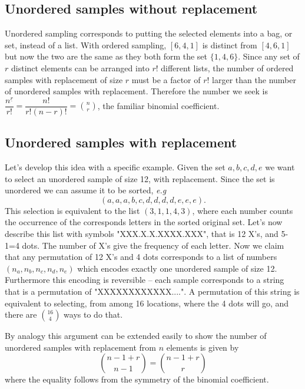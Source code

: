 \documentclass[../main.tex]{subfiles}
\begin{document}
\subsection{Unordered samples without replacement}
Unordered sampling corresponds to putting the selected elements into a
bag, or set, instead of a list. With ordered sampling, $[6,4,1]$ is distinct from $[4,6,1]$ but now
the two are the same as they both form the set $\{1,4,6\}.$ Since any set of $r$ distinct
elements can be arranged into $r!$ different lists, the number of ordered samples with replacement of size $r$ must be a factor of $r!$ larger than the number of unordered samples
with replacement. Therefore the number we seek is $
\dfrac{n^{\underline{r}}}{r!} = \dfrac{n!}{r!(n-r)!}
 = \displaystyle {n \choose r}$, the familiar binomial coefficient.
\subsection{Unordered samples with replacement}
Let's develop this idea with a specific example. Given the set ${a,b,c,d,e}$ we want
to select an unordered sample of size 12, with replacement. Since the
set is unordered we can assume it to be sorted, \textit{e.g} 
	$$(a,a,a,b,c,d,d,d,d,e,e,e).$$
This selection is equivalent to the list $(3,1,1,4,3)$, where each number counts the occurrence
of the corresponds letters in the sorted original set. Let's now describe this list
with symbols "XXX.X.X.XXXX.XXX", that is 12 X's, and 5-1=4 dots. The number of X's 
give the frequency of each letter. Now we claim that any permutation
of 12 X's and 4 dots corresponds to a list of numbers $(n_a,n_b,n_c,n_d,n_e)$
which encodes exactly one unordered sample of size 12. Furthermore this encoding is reversible
-- each sample corresponds to a string that is a permutation of "XXXXXXXXXXXX....". 
A permutation of this string is equivalent to selecting, from among 16 locations,
where the 4 dots will go, and there are $\displaystyle {16 \choose 4}$ ways to do that.

By analogy this argument can be extended easily to show the number of unordered samples with replacement from $n$ elements is given by $${n-1+r \choose n-1} = {n-1+r \choose r}$$
where the equality follows from the symmetry of the binomial coefficient.
\end{document}
